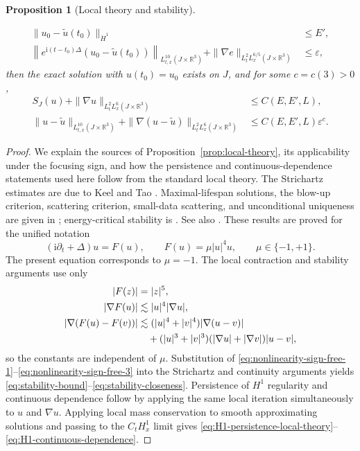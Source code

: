 \documentclass{interact}
\numberwithin{equation}{section}
\theoremstyle{plain}
\newtheorem{proposition}[theorem]{Proposition}
\theoremstyle{definition}
\theoremstyle{remark}
\newcommand{\R}{\mathbb R}
\newcommand{\ii}{\mathrm i}
\begin{document}
\begin{proposition}[Local theory and stability]
\begin{enumerate}[label=\textup{(\roman*)},leftmargin=2.4em]
 \begin{align*}
  \|u_0-\widetilde u(t_0)\|_{\dot H^1}&\le E',\\
  \left\|e^{\ii(t-t_0)\Delta}
  (u_0-\widetilde u(t_0))\right\|_{L_{t,x}^{10}(J\times\R^3)}
  +\|\nabla e\|_{L_t^2L_x^{6/5}(J\times\R^3)}&\le\varepsilon,
 \end{align*}
 then the exact solution with $u(t_0)=u_0$ exists on $J$, and for some $c=c(3)>0$,
 \begin{align}
  S_J(u)+\|\nabla u\|_{L_t^2L_x^6(J\times\R^3)}
  &\le C(E,E',L),
  \label{eq:stability-bound}\\
  \|u-\widetilde u\|_{L_{t,x}^{10}(J\times\R^3)}
  +\|\nabla(u-\widetilde u)\|_{L_t^2L_x^6(J\times\R^3)}
  &\le C(E,E',L)\varepsilon^c.
  \label{eq:stability-closeness}
 \end{align}
\end{enumerate}
\end{proposition}

\begin{proof}
We explain the sources of Proposition~\ref{prop:local-theory}, its applicability under the focusing sign, and how the persistence and continuous-dependence statements used here follow from the standard local theory. The Strichartz estimates are due to Keel and Tao \cite{KeelTao1998}. Maximal-lifespan solutions, the blow-up criterion, scattering criterion, small-data scattering, and unconditional uniqueness are given in \cite[Theorem~3.4 and Corollaries~3.5 and~3.9]{KillipVisan2013}; energy-critical stability is \cite[Theorem~3.8]{KillipVisan2013}. See also \cite{Cazenave2003,KenigMerle2006}. These results are proved for the unified notation
\[
 (\ii\partial_t+\Delta)u=F(u),
 \qquad
 F(u)=\mu|u|^4u,
 \qquad \mu\in\{-1,+1\}.
\]
The present equation corresponds to $\mu=-1$. The local contraction and stability arguments use only
\begin{align}
 |F(z)|&=|z|^5,
 \label{eq:nonlinearity-sign-free-1}\\
 |\nabla F(u)|&\lesssim |u|^4|\nabla u|,\notag\\
 |\nabla(F(u)-F(v))|
 &\lesssim (|u|^4+|v|^4)|\nabla(u-v)|
 \notag\\
 &\quad+(|u|^3+|v|^3)(|\nabla u|+|\nabla v|)|u-v|,
 \label{eq:nonlinearity-sign-free-3}
\end{align}
so the constants are independent of $\mu$. Substitution of \eqref{eq:nonlinearity-sign-free-1}--\eqref{eq:nonlinearity-sign-free-3} into the Strichartz and continuity arguments yields \eqref{eq:stability-bound}--\eqref{eq:stability-closeness}. Persistence of $H^1$ regularity and continuous dependence follow by applying the same local iteration simultaneously to $u$ and $\nabla u$. Applying local mass conservation to smooth approximating solutions and passing to the $C_tH_x^1$ limit gives \eqref{eq:H1-persistence-local-theory}--\eqref{eq:H1-continuous-dependence}.
\end{proof}
\end{document}
